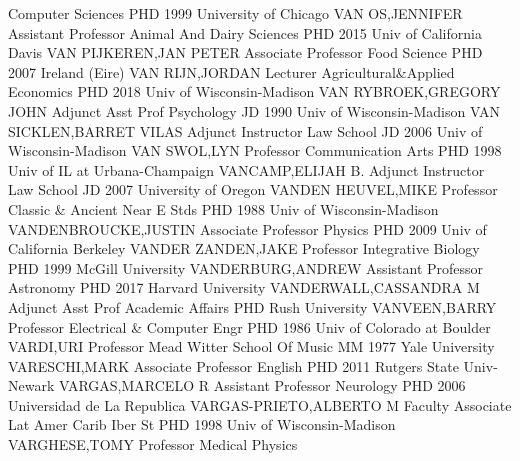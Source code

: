 \documentclass[
]{article}
\begin{document}
\textbar Computer Sciences \textbar PHD 1999 University of Chicago
\textbar{}  \textbar VAN OS,JENNIFER \textbar Assistant
Professor \textbar Animal And Dairy Sciences \textbar PHD 2015 Univ of
California Davis \textbar{}  \textbar VAN PIJKEREN,JAN PETER
\textbar Associate Professor \textbar Food Science \textbar PHD 2007
Ireland (Eire) \textbar{}  \textbar VAN RIJN,JORDAN
\textbar Lecturer \textbar Agricultural\&Applied Economics \textbar PHD
2018 Univ of Wisconsin-Madison \textbar{}  \textbar VAN
RYBROEK,GREGORY JOHN \textbar Adjunct Asst Prof \textbar Psychology
\textbar JD 1990 Univ of Wisconsin-Madison \textbar{} 
\textbar VAN SICKLEN,BARRET VILAS \textbar Adjunct Instructor
\textbar Law School \textbar JD 2006 Univ of Wisconsin-Madison
\textbar{}  \textbar VAN SWOL,LYN \textbar Professor
\textbar Communication Arts \textbar PHD 1998 Univ of IL at
Urbana-Champaign \textbar{}  \textbar VANCAMP,ELIJAH B.
\textbar Adjunct Instructor \textbar Law School \textbar JD 2007
University of Oregon \textbar{}  \textbar VANDEN HEUVEL,MIKE
\textbar Professor \textbar Classic \& Ancient Near E Stds \textbar PHD
1988 Univ of Wisconsin-Madison \textbar{} 
\textbar VANDENBROUCKE,JUSTIN \textbar Associate Professor
\textbar Physics \textbar PHD 2009 Univ of California Berkeley
\textbar{}  \textbar VANDER ZANDEN,JAKE \textbar Professor
\textbar Integrative Biology \textbar PHD 1999 McGill University
\textbar{}  \textbar VANDERBURG,ANDREW \textbar Assistant
Professor \textbar Astronomy \textbar PHD 2017 Harvard University
\textbar{}  \textbar VANDERWALL,CASSANDRA M \textbar Adjunct
Asst Prof \textbar Academic Affairs \textbar PHD Rush University
\textbar{}  \textbar VANVEEN,BARRY \textbar Professor
\textbar Electrical \& Computer Engr \textbar PHD 1986 Univ of Colorado
at Boulder \textbar{}  \textbar VARDI,URI \textbar Professor
\textbar Mead Witter School Of Music \textbar MM 1977 Yale University
\textbar{}  \textbar VARESCHI,MARK \textbar Associate
Professor \textbar English \textbar PHD 2011 Rutgers State Univ-Newark
\textbar{}  \textbar VARGAS,MARCELO R \textbar Assistant
Professor \textbar Neurology \textbar PHD 2006 Universidad de La
Republica \textbar{}  \textbar VARGAS-PRIETO,ALBERTO M
\textbar Faculty Associate \textbar Lat Amer Carib Iber St \textbar PHD
1998 Univ of Wisconsin-Madison \textbar{} 
\textbar VARGHESE,TOMY \textbar Professor \textbar Medical Physics
\end{document}
